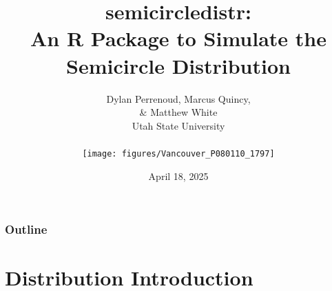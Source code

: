 \documentclass[handout, xcolor=dvipsnames]{beamer}
\begin{document}

\title[\hspace*{0.5cm} Mathematical Statistics With R
	   \hspace*{80pt}\hfill \insertframenumber\hspace*{0.5cm}]
       {semicircledistr:\\An R Package to Simulate the\\Semicircle Distribution}


\author[\hspace*{0cm}\hfill April 18, 2025\hspace*{0.25cm}]
		{Dylan Perrenoud, Marcus Quincy,\\
        \& Matthew White\\
        [0.2cm]
		Utah State University\\
        [-2.2cm]
		~ \\
		\flushright\texttt{[image: figures/Vancouver\_P080110\_1797]}
}

\date{April 18, 2025}


\frame{
  \titlepage
}








\begin{frame} 
\frametitle{Outline}
  \tableofcontents
\end{frame}




\section{Distribution Introduction}  
\end{document}
